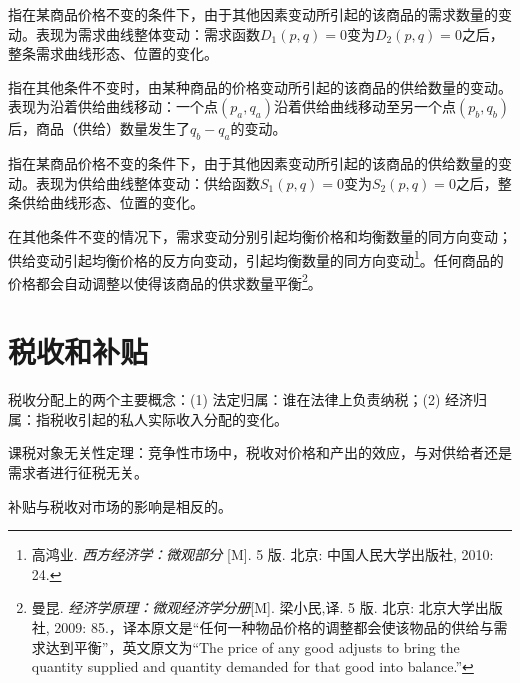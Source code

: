 \begin{Definition}[需求的变动]
指在某商品价格不变的条件下，由于其他因素变动所引起的该商品的需求数量的变动。表现为需求曲线整体变动：需求函数$D_1(p,q)=0$变为$D_2(p,q)=0$之后，整条需求曲线形态、位置的变化。
\end{Definition}

\begin{Definition}[供给量的变动]
指在其他条件不变时，由某种商品的价格变动所引起的该商品的供给数量的变动。表现为沿着供给曲线移动：一个点$(p_a, q_a)$沿着供给曲线移动至另一个点$(p_b, q_b)$后，商品（供给）数量发生了$q_b - q_a$的变动。
\end{Definition}

\begin{Definition}[供给的变动]
指在某商品价格不变的条件下，由于其他因素变动所引起的该商品的供给数量的变动。表现为供给曲线整体变动：供给函数$S_1(p,q)=0$变为$S_2(p,q)=0$之后，整条供给曲线形态、位置的变化。
\end{Definition}

\begin{Theorem}[供求定理]
在其他条件不变的情况下，需求变动分别引起均衡价格和均衡数量的同方向变动；供给变动引起均衡价格的反方向变动，引起均衡数量的同方向变动\footnote{%
高鸿业. \emph{西方经济学：微观部分} [M]. 5 版. 北京: 中国人民大学出版社, 2010: 24.}。任何商品的价格都会自动调整以使得该商品的供求数量平衡\footnote{%
曼昆. \emph{经济学原理：微观经济学分册}[M]. 梁小民,译. 5 版. 北京: 北京大学出版社, 2009: 85.，译本原文是“任何一种物品价格的调整都会使该物品的供给与需求达到平衡”，英文原文为“The price of any good adjusts to bring the quantity supplied and quantity demanded for that good into balance.”}。
\end{Theorem}
\section{税收和补贴}

税收分配上的两个主要概念：(1) 法定归属：谁在法律上负责纳税；(2) 经济归属：指税收引起的私人实际收入分配的变化。

课税对象无关性定理：竞争性市场中，税收对价格和产出的效应，与对供给者还是需求者进行征税无关。

补贴与税收对市场的影响是相反的。

